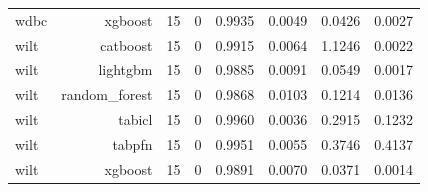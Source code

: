 \begin{table}[htbp]
\begin{tabular}{lrrrrrrr}
wdbc & xgboost & 15 & 0 & 0.9935 & 0.0049 & 0.0426 & 0.0027 \\
wilt & catboost & 15 & 0 & 0.9915 & 0.0064 & 1.1246 & 0.0022 \\
wilt & lightgbm & 15 & 0 & 0.9885 & 0.0091 & 0.0549 & 0.0017 \\
wilt & random\_forest & 15 & 0 & 0.9868 & 0.0103 & 0.1214 & 0.0136 \\
wilt & tabicl & 15 & 0 & 0.9960 & 0.0036 & 0.2915 & 0.1232 \\
wilt & tabpfn & 15 & 0 & 0.9951 & 0.0055 & 0.3746 & 0.4137 \\
wilt & xgboost & 15 & 0 & 0.9891 & 0.0070 & 0.0371 & 0.0014 \\
\hline
\end{tabular}
\end{table}
